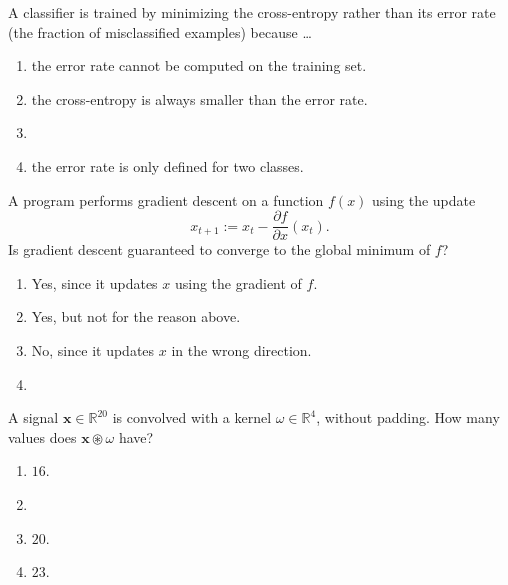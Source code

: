 \documentclass[11pt, a4paper]{exam}
\begin{document}
\begin{quiz}
    \item A classifier is trained by minimizing the cross-entropy rather than its error rate (the fraction of misclassified examples) because \ldots
    \begin{enumerate}[label=$\bigcirc$]
        \item the error rate cannot be computed on the training set.
        \item the cross-entropy is always smaller than the error rate.
        \item {}
        \item the error rate is only defined for two classes.
    \end{enumerate}

    \item A program performs gradient descent on a function $f(x)$ using the update
    \[
        x_{t+1} := x_t - \frac{\partial f}{\partial x}(x_t).
    \]
    Is gradient descent guaranteed to converge to the global minimum of $f$?
    \begin{enumerate}[label=$\bigcirc$]
        \item Yes, since it updates $x$ using the gradient of $f$.
        \item Yes, but not for the reason above.
        \item No, since it updates $x$ in the wrong direction.
        \item {}
    \end{enumerate}

    \item A signal $\mathbf{x} \in \mathbb{R}^{20}$ is convolved with a kernel $\omega \in \mathbb{R}^4$, without padding. How many values does $\mathbf{x} \circledast \omega$ have?
    \begin{enumerate}[label=$\bigcirc$]
        \item $16$.
        \item {}
        \item $20$.
        \item $23$.
    \end{enumerate}


\end{quiz}
\end{document}

